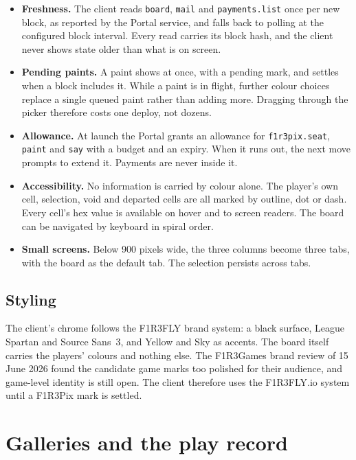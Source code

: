 \documentclass[11pt,a4paper]{article}
\newcommand{\code}[1]{\texttt{#1}}
\begin{document}
\begin{itemize}[leftmargin=1.2em,itemsep=2pt]
\item \textbf{Freshness.} The client reads \code{board}, \code{mail} and \code{payments.list}
  once per new block, as reported by the Portal service, and falls back to polling at the
  configured block interval. Every read carries its block hash, and the client never shows
  state older than what is on screen.
\item \textbf{Pending paints.} A paint shows at once, with a pending mark, and settles when a
  block includes it. While a paint is in flight, further colour choices replace a single queued
  paint rather than adding more. Dragging through the picker therefore costs one deploy, not
  dozens.
\item \textbf{Allowance.} At launch the Portal grants an allowance for \code{f1r3pix.seat},
  \code{paint} and \code{say} with a budget and an expiry. When it runs out, the next move
  prompts to extend it. Payments are never inside it.
\item \textbf{Accessibility.} No information is carried by colour alone. The player's own cell,
  selection, void and departed cells are all marked by outline, dot or dash. Every cell's hex
  value is available on hover and to screen readers. The board can be navigated by keyboard
  in spiral order.
\item \textbf{Small screens.} Below 900 pixels wide, the three columns become three tabs, with
  the board as the default tab. The selection persists across tabs.
\end{itemize}

\subsection{Styling}

The client's chrome follows the F1R3FLY brand system: a black surface, League Spartan and
Source Sans~3, and Yellow and Sky as accents. The board itself carries the players' colours and
nothing else. The F1R3Games brand review of 15 June 2026 found the candidate game marks too
polished for their audience, and game-level identity is still open. The client therefore
uses the F1R3FLY.io system until a F1R3Pix mark is settled.

\section{Galleries and the play record}\label{sec:gallery}
\end{document}
